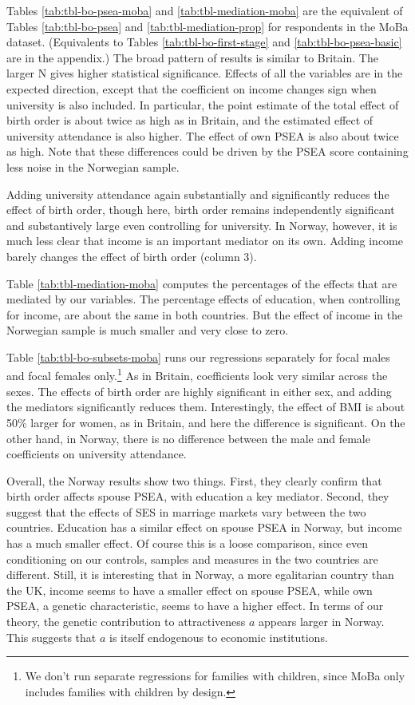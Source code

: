 \documentclass[
  12pt,
]{article}
\theoremstyle{definition}
\theoremstyle{definition}
\theoremstyle{definition}
\theoremstyle{definition}
\theoremstyle{remark}
\begin{document}
Tables \ref{tab:tbl-bo-psea-moba} and \ref{tab:tbl-mediation-moba} are the
equivalent of Tables \ref{tab:tbl-bo-psea} and \ref{tab:tbl-mediation-prop}
for respondents in the MoBa dataset. (Equivalents to Tables
\ref{tab:tbl-bo-first-stage} and \ref{tab:tbl-bo-psea-basic} are in the
appendix.) The broad pattern of results is similar to Britain. The larger N
gives higher statistical significance. Effects of all the variables are in the
expected direction, except that the coefficient on income changes sign when
university is also included. In particular, the point estimate of the total
effect of birth order is about twice as high as in Britain, and the estimated
effect of university attendance is also higher. The effect of own PSEA is also
about twice as high. Note that these differences could be driven by the PSEA score
containing less noise in the Norwegian sample.

Adding university attendance again substantially and significantly reduces
the effect of birth order, though here, birth order remains independently
significant and substantively large even controlling for university.
In Norway, however, it is much less clear that income is an important mediator on its own. Adding income barely changes the effect of birth order (column 3).

Table \ref{tab:tbl-mediation-moba} computes the percentages of the effects that
are mediated by our variables. The percentage effects of education, when
controlling for income, are about the same in both countries. But the effect of
income in the Norwegian sample is much smaller and very close to zero.

Table \ref{tab:tbl-bo-subsets-moba} runs our regressions separately for focal
males and focal females only.\footnote{We don't run separate regressions for families with children, since
  MoBa only includes families with children by design.} As in Britain, coefficients look very
similar across the sexes. The effects of birth order are highly significant in
either sex, and adding the mediators significantly reduces them. Interestingly,
the effect of BMI is about 50\% larger for women, as in Britain, and here the
difference is significant. On the other hand, in Norway, there is no difference
between the male and female coefficients on university attendance.

Overall, the Norway results show two things. First, they clearly confirm that
birth order affects spouse PSEA, with education a key mediator. Second, they
suggest that the effects of SES in marriage markets vary between the two
countries. Education has a similar effect on spouse PSEA in Norway, but income
has a much smaller effect. Of course this is a loose comparison, since even
conditioning on our controls, samples and measures in the two countries are
different. Still, it is interesting that in Norway, a more egalitarian country
than the UK, income seems to have a smaller effect on spouse PSEA, while own
PSEA, a genetic characteristic, seems to have a higher effect. In terms of our
theory, the genetic contribution to attractiveness \(a\) appears larger in Norway.
This suggests that \(a\) is itself endogenous to economic institutions.
\end{document}
